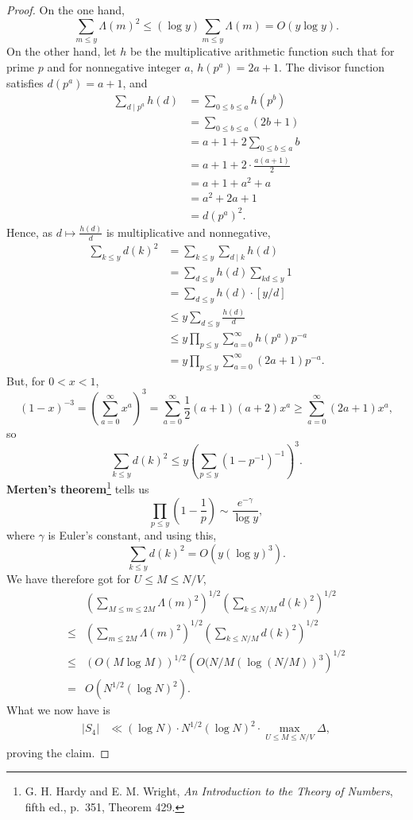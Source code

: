 \documentclass{article}
\theoremstyle{definition}
\begin{document}
\begin{proof}
On the one hand,
\[
\sum_{m \leq y} \Lambda(m)^2 \leq (\log y) \sum_{ m\leq y} \Lambda(m) = O(y \log y).
\]
On the other hand,
let $h$ be the multiplicative arithmetic function such that
for prime $p$ and for nonnegative integer $a$, $h(p^a)=2a+1$. The divisor function satisfies
$d(p^a)=a+1$, and
\begin{align*}
\sum_{d \mid p^a} h(d)&=\sum_{0 \leq b \leq a} h(p^b)\\
&=\sum_{0 \leq b \leq a} (2b+1)\\
&=a+1+2\sum_{0 \leq b \leq a} b\\
&=a+1+2 \cdot \frac{a(a+1)}{2}\\
&=a+1+a^2+a\\
&=a^2+2a+1\\
&=d(p^a)^2.
\end{align*}
Hence, as $d \mapsto \frac{h(d)}{d}$ is multiplicative and nonnegative,
\begin{align*}
\sum_{k \leq y} d(k)^2&=\sum_{k \leq y} \sum_{d \mid k} h(d)\\
&=\sum_{d \leq y} h(d) \sum_{kd \leq y} 1\\
&=\sum_{d \leq y} h(d) \cdot [y/d]\\
&\leq y \sum_{d \leq y} \frac{h(d)}{d}\\
&\leq y \prod_{p \leq y} \sum_{a=0}^\infty h(p^a) p^{-a}\\
&= y \prod_{p \leq y} \sum_{a=0}^\infty (2a+1) p^{-a}.
\end{align*}
But, for $0<x<1$,
\[
\left(1-x \right)^{-3}=\left( \sum_{a=0}^\infty x^a \right)^3
=\sum_{a=0}^\infty \frac{1}{2}(a+1)(a+2) x^{a}
\geq  \sum_{a=0}^\infty (2a+1) x^{a},
\]
so
\[
\sum_{k \leq y} d(k)^2 \leq y  \left( \sum_{p \leq y} \left(1-p^{-1}\right)^{-1} \right)^{3}.
\]
\textbf{Merten's theorem}\footnote{G. H. Hardy and E. M. Wright, {\em An Introduction to the Theory of Numbers},
fifth ed., p.~351, Theorem 429.} tells us
\[
\prod_{p \leq y} \left(1-\frac{1}{p}\right) \sim \frac{e^{-\gamma}}{\log y},
\]
where $\gamma$ is Euler's constant, and using this,
\[
\sum_{k \leq y} d(k)^2 = O(y (\log y)^3).
\]
We have therefore got for $U \leq M \leq N/V$,
\[
\begin{split}
&\left( \sum_{M \leq m \leq 2M} \Lambda(m)^2 \right)^{1/2} \left( \sum_{k \leq N/M} d(k)^2 \right)^{1/2}\\
\leq& \left( \sum_{m \leq 2M} \Lambda(m)^2 \right)^{1/2} \left( \sum_{k \leq N/M} d(k)^2 \right)^{1/2}\\
\leq& \left( O(M \log M) \right)^{1/2} \left( O(N/M (\log(N/M))^3 \right)^{1/2}\\
=&O( N^{1/2} (\log N)^2).
\end{split}
\]
What we now have is 
\begin{align*}
|S_4|&\ll (\log N) \cdot N^{1/2} (\log N)^2 \cdot \max_{U \leq M \leq N/V} \Delta,
\end{align*}
proving the claim.
\end{proof}
\end{document}
